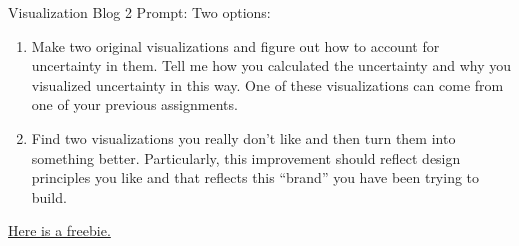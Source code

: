 \documentclass[
  ignorenonframetext,
]{beamer}
\begin{document}
\begin{frame}{Visualization Blog 2 Prompt:}
\protect\hypertarget{visualization-blog-2-prompt}{}
Two options:

\begin{enumerate}
[1)]
\item
  Make two original visualizations and figure out how to account for
  uncertainty in them. Tell me how you calculated the uncertainty and
  why you visualized uncertainty in this way. One of these
  visualizations can come from one of your previous assignments.
\item
  Find two visualizations you really don't like and then turn them into
  something better. Particularly, this improvement should reflect design
  principles you like and that reflects this ``brand'' you have been
  trying to build.
\end{enumerate}

\href{https://twitter.com/AlecStapp/status/1582704817612283904}{Here is
a freebie.}
\end{frame}
\end{document}
